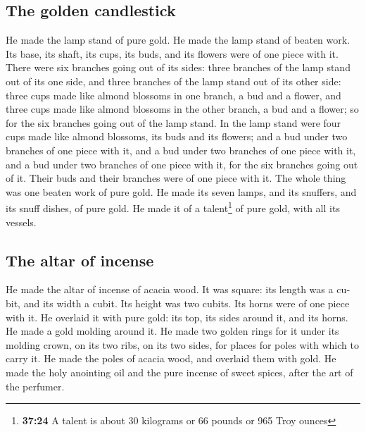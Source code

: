 \begin{paracol}{2}
\begin{otherlanguage}{english}
\hypertarget{the-golden-candlestick}{%
\subsection{The golden candlestick}\label{the-golden-candlestick}}

 He made the lamp stand of pure gold. He made the lamp
stand of beaten work. Its base, its shaft, its cups, its buds, and its
flowers were of one piece with it.  There were six
branches going out of its sides: three branches of the lamp stand out of
its one side, and three branches of the lamp stand out of its other
side:  three cups made like almond blossoms in one
branch, a bud and a flower, and three cups made like almond blossoms in
the other branch, a bud and a flower; so for the six branches going out
of the lamp stand.  In the lamp stand were four cups made
like almond blossoms, its buds and its flowers;  and a
bud under two branches of one piece with it, and a bud under two
branches of one piece with it, and a bud under two branches of one piece
with it, for the six branches going out of it.  Their
buds and their branches were of one piece with it. The whole thing was
one beaten work of pure gold.  He made its seven lamps,
and its snuffers, and its snuff dishes, of pure gold.  He
made it of a talent\footnote{\textbf{37:24} A talent is about 30
  kilograms or 66 pounds or 965 Troy ounces} of pure gold, with all its
vessels.

\hypertarget{the-altar-of-incense}{%
\subsection{The altar of incense}\label{the-altar-of-incense}}

 He made the altar of incense of acacia wood. It was
square: its length was a cubit, and its width a cubit. Its height was
two cubits. Its horns were of one piece with it.  He
overlaid it with pure gold: its top, its sides around it, and its horns.
He made a gold molding around it.  He made two golden
rings for it under its molding crown, on its two ribs, on its two sides,
for places for poles with which to carry it.  He made the
poles of acacia wood, and overlaid them with gold.  He
made the holy anointing oil and the pure incense of sweet spices, after
the art of the perfumer.


\end{otherlanguage}
\end{paracol}
